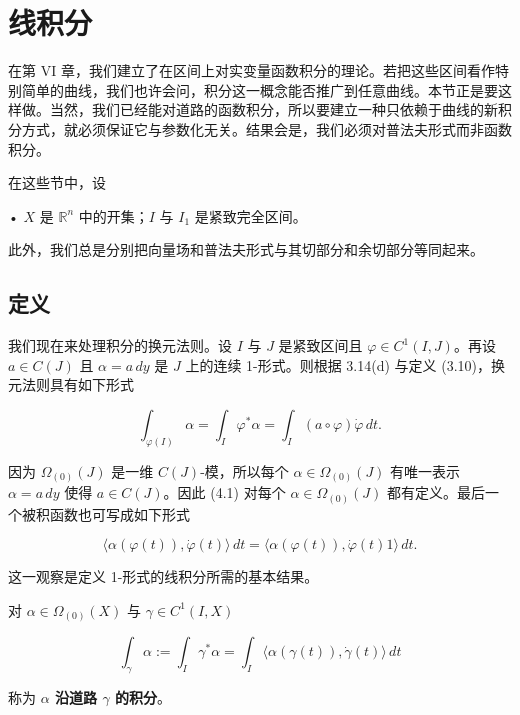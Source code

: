 \section{线积分}

在第 VI 章，我们建立了在区间上对实变量函数积分的理论。若把这些区间看作特别简单的曲线，我们也许会问，积分这一概念能否推广到任意曲线。本节正是要这样做。当然，我们已经能对道路的函数积分，所以要建立一种只依赖于曲线的新积分方式，就必须保证它与参数化无关。结果会是，我们必须对普法夫形式而非函数积分。

在这些节中，设

• $ X $ 是 $ \mathbb{R}^{n} $ 中的开集；$ I $ 与 $ I_1 $ 是紧致完全区间。

此外，我们总是分别把向量场和普法夫形式与其切部分和余切部分等同起来。

\subsection*{定义}

我们现在来处理积分的换元法则。设 $ I $ 与 $ J $ 是紧致区间且 $ \varphi \in C^1(I, J) $。再设 $ a \in C(J) $ 且 $ \alpha = a\,dy $ 是 $ J $ 上的连续 1-形式。则根据 3.14(d) 与定义 (3.10)，换元法则具有如下形式

\begin{equation}
\int_{\varphi(I)}\alpha=\int_I\varphi^{*}\alpha=\int_I(a\circ\varphi)\dot{\varphi}\,dt .\tag{4.1}
\end{equation}

因为 $ \Omega_{(0)}(J) $ 是一维 $ C(J) $-模，所以每个 $ \alpha \in \Omega_{(0)}(J) $ 有唯一表示 $ \alpha = a\,dy $ 使得 $ a \in C(J) $。因此 (4.1) 对每个 $ \alpha \in \Omega_{(0)}(J) $ 都有定义。最后一个被积函数也可写成如下形式

\[
\langle\alpha(\varphi(t)),\dot{\varphi}(t)\rangle\,dt=\langle\alpha(\varphi(t)),\dot{\varphi}(t)1\rangle\,dt .
\]

这一观察是定义 1-形式的线积分所需的基本结果。

对 $ \alpha \in \Omega_{(0)}(X) $ 与 $ \gamma \in C^1(I, X) $

\[
\int_{\gamma}\alpha:=\int_I\gamma^{*}\alpha=\int_I\langle\alpha(\gamma(t)),\dot{\gamma}(t)\rangle\,dt
\]

称为 \textbf{$ \alpha $ 沿道路 $ \gamma $ 的积分}。

